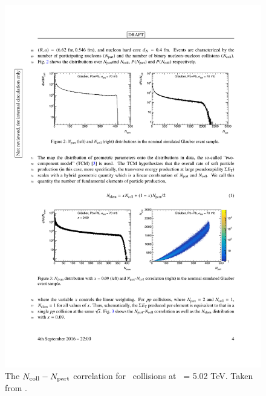 \begin{figure}
\begin{center}
  \begin{minipage}[b]{0.4\textwidth}
\includegraphics[width=\textwidth]{figures/theory/NcollNpart}
\caption{The $\mbox{$N_{\mathrm{coll}}$}-\mbox{$N_{\mathrm{part}}$}$ correlation for \pbpb\ collisions at \sqrtsnn\ = 5.02 TeV.
Taken from \cite{Perepelitsa:2212936}.}
\label{fig:NcollNpart}
  \end{minipage}
 \qquad  \qquad  \qquad
  \begin{minipage}[b]{0.4\textwidth}

\end{minipage}
\end{center}
\end{figure}
